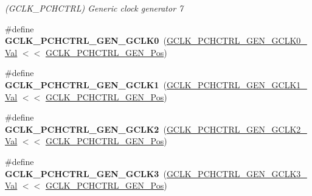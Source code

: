 \begin{DoxyCompactItemize}
\begin{DoxyCompactList}\small\item\em (G\+C\+L\+K\+\_\+\+P\+C\+H\+C\+T\+R\+L) Generic clock generator 7 \end{DoxyCompactList}\item 
\hypertarget{group___s_a_m_l21___g_c_l_k_ga3798845398aaaad6fb21adee21a18a5e}{}\#define {\bfseries G\+C\+L\+K\+\_\+\+P\+C\+H\+C\+T\+R\+L\+\_\+\+G\+E\+N\+\_\+\+G\+C\+L\+K0}~(\hyperlink{group___s_a_m_l21___g_c_l_k_ga0cdef65a9bb3f8c6df6b6d1496234af3}{G\+C\+L\+K\+\_\+\+P\+C\+H\+C\+T\+R\+L\+\_\+\+G\+E\+N\+\_\+\+G\+C\+L\+K0\+\_\+\+Val}    $<$$<$ \hyperlink{group___s_a_m_l21___g_c_l_k_ga43f3e8ba61616cbd7885f4c9ebfb5942}{G\+C\+L\+K\+\_\+\+P\+C\+H\+C\+T\+R\+L\+\_\+\+G\+E\+N\+\_\+\+Pos})\label{group___s_a_m_l21___g_c_l_k_ga3798845398aaaad6fb21adee21a18a5e}

\item 
\hypertarget{group___s_a_m_l21___g_c_l_k_gac613c4786793c973950bfb4cf4f993ed}{}\#define {\bfseries G\+C\+L\+K\+\_\+\+P\+C\+H\+C\+T\+R\+L\+\_\+\+G\+E\+N\+\_\+\+G\+C\+L\+K1}~(\hyperlink{group___s_a_m_l21___g_c_l_k_gaa7676f67f8a1f0b2bb0cfbc31fde5863}{G\+C\+L\+K\+\_\+\+P\+C\+H\+C\+T\+R\+L\+\_\+\+G\+E\+N\+\_\+\+G\+C\+L\+K1\+\_\+\+Val}    $<$$<$ \hyperlink{group___s_a_m_l21___g_c_l_k_ga43f3e8ba61616cbd7885f4c9ebfb5942}{G\+C\+L\+K\+\_\+\+P\+C\+H\+C\+T\+R\+L\+\_\+\+G\+E\+N\+\_\+\+Pos})\label{group___s_a_m_l21___g_c_l_k_gac613c4786793c973950bfb4cf4f993ed}

\item 
\hypertarget{group___s_a_m_l21___g_c_l_k_ga88c3d37f814c6dfe519738983b3d3d3f}{}\#define {\bfseries G\+C\+L\+K\+\_\+\+P\+C\+H\+C\+T\+R\+L\+\_\+\+G\+E\+N\+\_\+\+G\+C\+L\+K2}~(\hyperlink{group___s_a_m_l21___g_c_l_k_ga8cf0d7436042a4cfe4776fdbc8942f57}{G\+C\+L\+K\+\_\+\+P\+C\+H\+C\+T\+R\+L\+\_\+\+G\+E\+N\+\_\+\+G\+C\+L\+K2\+\_\+\+Val}    $<$$<$ \hyperlink{group___s_a_m_l21___g_c_l_k_ga43f3e8ba61616cbd7885f4c9ebfb5942}{G\+C\+L\+K\+\_\+\+P\+C\+H\+C\+T\+R\+L\+\_\+\+G\+E\+N\+\_\+\+Pos})\label{group___s_a_m_l21___g_c_l_k_ga88c3d37f814c6dfe519738983b3d3d3f}

\item 
\hypertarget{group___s_a_m_l21___g_c_l_k_gadf7f6064ed61cbdb3d1294ff0487dd39}{}\#define {\bfseries G\+C\+L\+K\+\_\+\+P\+C\+H\+C\+T\+R\+L\+\_\+\+G\+E\+N\+\_\+\+G\+C\+L\+K3}~(\hyperlink{group___s_a_m_l21___g_c_l_k_gaf24b4356f07e8ba81882e8eace7007c8}{G\+C\+L\+K\+\_\+\+P\+C\+H\+C\+T\+R\+L\+\_\+\+G\+E\+N\+\_\+\+G\+C\+L\+K3\+\_\+\+Val}    $<$$<$ \hyperlink{group___s_a_m_l21___g_c_l_k_ga43f3e8ba61616cbd7885f4c9ebfb5942}{G\+C\+L\+K\+\_\+\+P\+C\+H\+C\+T\+R\+L\+\_\+\+G\+E\+N\+\_\+\+Pos})\label{group___s_a_m_l21___g_c_l_k_gadf7f6064ed61cbdb3d1294ff0487dd39}


\end{DoxyCompactItemize}
